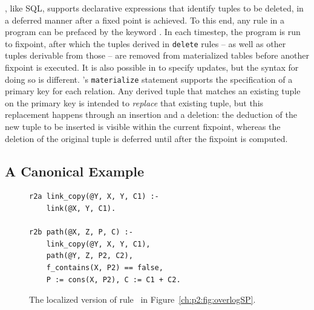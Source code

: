 \OVERLOG, like SQL, supports declarative expressions that identify tuples to be
deleted, in a deferred manner after a fixed point is achieved.  To this end,
any \OVERLOG rule in a program can be prefaced by the keyword .  In
each timestep, the program is run to fixpoint, after which the tuples derived
in {\tt delete} rules -- as well as other tuples derivable from those -- are
removed from materialized tables before another fixpoint is executed.  It is
also possible in \OVERLOG to specify updates, but the syntax for doing so is
different.  \OVERLOG's {\tt materialize} statement supports the specification
of a primary key for each relation.  Any derived tuple that matches an existing
tuple on the primary key is intended to {\em replace} that existing tuple, but
this replacement happens through an insertion and a deletion: the deduction of
the new tuple to be inserted is visible within the current fixpoint, whereas
the deletion of the original tuple is deferred until after the fixpoint is
computed.

\subsection{A Canonical Example}
\label{ch:p2:sec:declnet}

\begin{figure}
\ssp
\begin{lstlisting}
r2a link_copy(@Y, X, Y, C1) :- 
    link(@X, Y, C1).

r2b path(@X, Z, P, C) :- 
    link_copy(@Y, X, Y, C1), 
    path(@Y, Z, P2, C2),
    f_contains(X, P2) == false,
    P := cons(X, P2), C := C1 + C2.
\end{lstlisting}
\caption{\label{ch:p2:fig:overlogSPLocal}The localized version of rule~ in
Figure~\ref{ch:p2:fig:overlogSP}.}
\end{figure}


